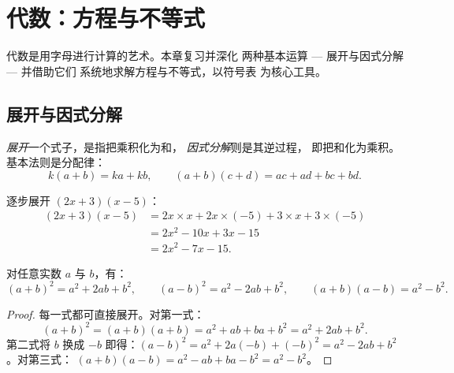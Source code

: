 \chapter{代数：方程与不等式}\label{ch:g10:algebra}

代数是用字母进行计算的艺术。本章复习并深化
两种基本运算 --- 展开与因式分解 --- 并借助它们
系统地求解方程与不等式，以符号表
为核心工具。

\section{展开与因式分解}

\begin{definition}[展开、因式分解]\label{def:g10:algebra:expand}
\emph{展开}一个式子，是指把乘积化为和，
\emph{因式分解}则是其逆过程，
即把和化为乘积。基本法则是分配律：
\[
k(a + b) = ka + kb,
\qquad
(a + b)(c + d) = ac + ad + bc + bd .
\]
\end{definition}

\begin{example}\label{ex:g10:algebra:expand}
逐步展开 $(2x + 3)(x - 5)$：
\begin{align*}
(2x + 3)(x - 5)
&= 2x \times x + 2x \times (-5) + 3 \times x + 3 \times (-5) \\
&= 2x^2 - 10x + 3x - 15 \\
&= 2x^2 - 7x - 15 .
\end{align*}
\end{example}

\begin{theorem}[乘法公式]\label{thm:g10:algebra:identities}
对任意实数 $a$ 与 $b$，有：
\[
(a+b)^2 = a^2 + 2ab + b^2,
\qquad
(a-b)^2 = a^2 - 2ab + b^2,
\qquad
(a+b)(a-b) = a^2 - b^2 .
\]
\end{theorem}

\begin{proof}
每一式都可直接展开。对第一式：
\[
(a+b)^2 = (a+b)(a+b) = a^2 + ab + ba + b^2 = a^2 + 2ab + b^2 .
\]
第二式将 $b$ 换成 $-b$ 即得：$(a-b)^2 = a^2 + 2a(-b) +
(-b)^2 = a^2 - 2ab + b^2$。对第三式：
$(a+b)(a-b) = a^2 - ab + ba - b^2 = a^2 - b^2$。
\end{proof}


